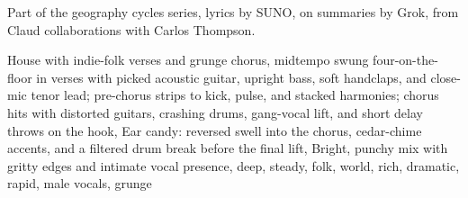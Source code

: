 
\begin{notes}
Part of the geography cycles series, lyrics by SUNO, on summaries by Grok, from Claud collaborations with Carlos Thompson.
\end{notes}
\begin{style}
House with indie-folk verses and grunge chorus, midtempo swung four-on-the-floor in verses with picked acoustic guitar, upright bass, soft handclaps, and close-mic tenor lead; pre-chorus strips to kick, pulse, and stacked harmonies; chorus hits with distorted guitars, crashing drums, gang-vocal lift, and short delay throws on the hook, Ear candy: reversed swell into the chorus, cedar-chime accents, and a filtered drum break before the final lift, Bright, punchy mix with gritty edges and intimate vocal presence, deep, steady, folk, world, rich, dramatic, rapid, male vocals, grunge
\end{style}
